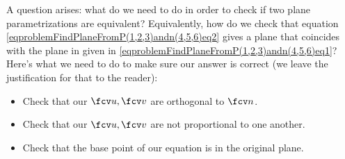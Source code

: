 {A question arises: what do we need to do in order to check if two plane parametrizations are equivalent? Equivalently, how do we check that equation \eqref{eqproblemFindPlaneFromP(1,2,3)andn(4,5,6)eq2} gives a plane that coincides with the plane in given in \eqref{eqproblemFindPlaneFromP(1,2,3)andn(4,5,6)eq1}? Here's what we need to do to make sure our answer is correct (we leave the justification for that to the reader):
\begin{itemize}
\item Check that our $\fcv u, \fcv v$ are orthogonal to $\fcv n$. 
\item Check that our $\fcv u, \fcv v$ are not proportional to one another. 
\item Check that the base point of our equation is in the original plane. 
\end{itemize}

}